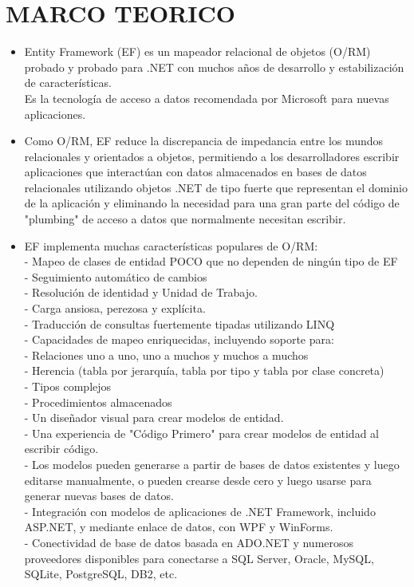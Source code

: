 \section{MARCO TEORICO} 
\begin {itemize}
\subsection{Entity Framework}
	\item Entity Framework (EF) es un mapeador relacional de objetos (O/RM) probado y probado para .NET con muchos años de desarrollo y estabilización de características.\\
Es la tecnología de acceso a datos recomendada por Microsoft para nuevas aplicaciones.\\	
	\item Como O/RM, EF reduce la discrepancia de impedancia entre los mundos relacionales y orientados a objetos, permitiendo a los desarrolladores escribir aplicaciones que interactúan con datos almacenados en bases de datos relacionales utilizando objetos .NET de tipo fuerte que representan el dominio de la aplicación y eliminando la necesidad para una gran parte del código de "plumbing" de acceso a datos que normalmente necesitan escribir.\\
	\item EF implementa muchas características populares de O/RM:\\
	- Mapeo de clases de entidad POCO que no dependen de ningún tipo de EF\\
	- Seguimiento automático de cambios\\
	- Resolución de identidad y Unidad de Trabajo.\\
	- Carga ansiosa, perezosa y explícita.\\
	- Traducción de consultas fuertemente tipadas utilizando LINQ \\
	- Capacidades de mapeo enriquecidas, incluyendo soporte para:\\
	\subitem - Relaciones uno a uno, uno a muchos y muchos a muchos\\
	\subitem - Herencia (tabla por jerarquía, tabla por tipo y tabla por clase concreta)\\
	\subitem - Tipos complejos\\
	\subitem - Procedimientos almacenados\\
	\newline
	- Un diseñador visual para crear modelos de entidad.\\
	- Una experiencia de "Código Primero" para crear modelos de entidad al escribir código.\\
	- Los modelos pueden generarse a partir de bases de datos existentes y luego editarse manualmente, o pueden crearse desde cero y luego usarse para generar nuevas bases de datos.\\
	- Integración con modelos de aplicaciones de .NET Framework, incluido ASP.NET, y mediante enlace de datos, con WPF y WinForms.\\
	- Conectividad de base de datos basada en ADO.NET y numerosos proveedores disponibles para conectarse a SQL Server, Oracle, MySQL, SQLite, PostgreSQL, DB2, etc.\\
	\newpage

\end{itemize}
